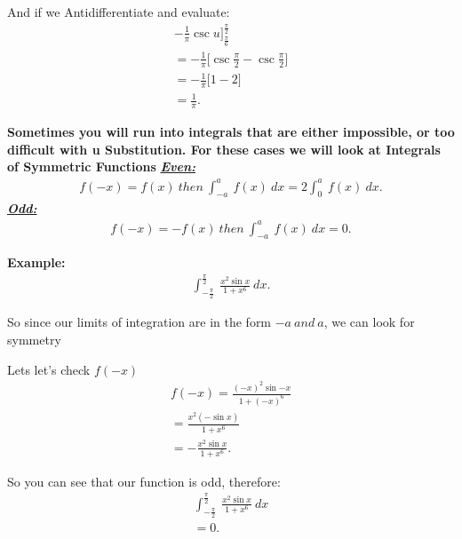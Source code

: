 \documentclass{report}
\begin{document}
  \bigbreak \noindent \bigbreak \noindent
  And if we Antidifferentiate and evaluate:
  \begin{align*}
    -\frac{1}{\pi}\csc{u}\bigg]_{\frac{\pi}{6}}^{\frac{\pi}{2}} \\
    = -\frac{1}{\pi}\bigg[\csc{\frac{\pi}{2} - \csc{\frac{\pi}{2}}}\bigg] \\
    = -\frac{1}{\pi}\bigg[1-2\bigg] \\
    \boxed{= \frac{1}{\pi}}
  .\end{align*}

  \pagebreak \bigbreak \noindent
  \begin{mdframed}
    \textbf{Sometimes you will run into integrals that are either impossible, or too difficult with u Substitution. For these cases we will look at Integrals of Symmetric Functions}
    \bigbreak \noindent \bigbreak \noindent
    \textbf{\textit{\underline{Even:}}} 
    \begin{align*}
      f(-x)  = f(x)\ then\ \int_{-a}^{a}\ f(x)\ dx  = 2 \int_{0}^{a}\ f(x)\ dx
    .\end{align*}
    \bigbreak \noindent \bigbreak \noindent
    \textbf{\textit{\underline{Odd:}}}
    \begin{align*}
      f(-x) = -f(x)\ then\ \int_{-a}^{a}\ f(x)\ dx = 0
    .\end{align*}
  \end{mdframed}
      \begin{figure}[ht]
          \centering
          \label{fig:fig1even}
      \end{figure}


  \bigbreak \noindent 
  \begin{mdframed}
    \textbf{Example: }
    \begin{align*}
      \int_{-\frac{\pi}{2}}^{\frac{\pi}{2}}\ \frac{x^{2}\sin{x}}{1+x^{6}}\ dx
    .\end{align*}
  \end{mdframed}

  \bigbreak \noindent \bigbreak \noindent
  So since our limits of integration are in the form $-a\ and\ a$, we can look for symmetry

  \bigbreak \noindent \bigbreak \noindent
  Lets let's check $f(-x) $
  \begin{align*}
    f(-x) = \frac{(-x)^{2}\sin{-x}}{1+(-x)^{6}} \\ 
    = \frac{x^{2}(-\sin{x})}{1+x^{6}} \\
    = -\frac{x^{2}\sin{x}}{1+x^{6}} 
  .\end{align*}

  \bigbreak \noindent \bigbreak \noindent
  So you can see that our function is odd, therefore:
  \begin{align*}
    \int_{-\frac{\pi}{2}}^{\frac{\pi}{2}}\ \frac{x^{2}\sin{x}}{1+x^{6}}\ dx \\
    \boxed{=0}
  .\end{align*}
  
\end{document}
